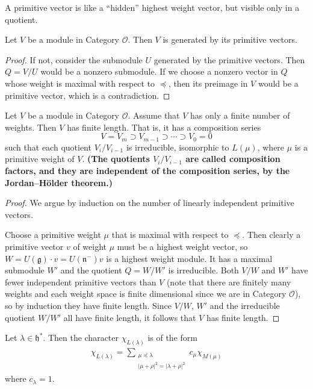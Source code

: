 \documentclass[12pt]{article}
\begin{document}
A primitive vector is like a “hidden” highest weight vector, but visible only in a quotient.

\begin{proposition}
    Let $V$ be a module in Category $\mathcal{O}$. Then $V$ is generated by its primitive vectors.
\end{proposition}

\begin{proof}
    If not, consider the submodule $U$ generated by the primitive vectors. Then $Q = V/U$ would be a nonzero submodule. If we choose a nonzero vector in $Q$ whose weight is maximal with respect to $\preceq$, then its preimage in $V$ would be a primitive vector, which is a contradiction.
\end{proof}

\begin{proposition}
    Let $V$ be a module in Category $\mathcal{O}$. Assume that $V$ has only a finite number of weights. Then $V$ has finite length. That is, it has a composition series
    \[
        V = V_m \supset V_{m-1} \supset \cdots \supset V_0 = 0
    \]
    such that each quotient $V_i/V_{i-1}$ is irreducible, isomorphic to $L(\mu)$, where $\mu$ is a primitive weight of $V$. \textbf{(The quotients $V_i/V_{i-1}$ are called composition factors, and they are independent of the composition series, by the Jordan–Hölder theorem.)}
\end{proposition}

\begin{proof}
    We argue by induction on the number of linearly independent primitive vectors.

    Choose a primitive weight $\mu$ that is maximal with respect to $\preceq$. Then clearly a primitive vector $v$ of weight $\mu$ must be a highest weight vector, so $W = U(\mathfrak{g}) \cdot v = U(\mathfrak{n}^-)v$ is a highest weight module. It has a maximal submodule $W'$ and the quotient $Q = W/W'$ is irreducible. Both $V/W$ and $W'$ have fewer independent primitive vectors than $V$ (note that there are finitely many weights and each weight space is finite dimensional since we are in Category $\mathcal{O}$), so by induction they have finite length. Since $V/W$, $W'$ and the irreducible quotient $W/W'$ all have finite length, it follows that $V$ has finite length.
\end{proof}

\begin{proposition}\label{prop:char-irr}
    Let $\lambda \in \mathfrak{h}^*$. Then the character $\chi_{L(\lambda)}$ is of the form
    \begin{align}
        \chi_{L(\lambda)} = \sum_{\substack{\mu \preceq \lambda \\ |\mu+\rho|^2 = |\lambda+\rho|^2}} c_\mu \chi_{M(\mu)}
    \end{align}
    where $c_\lambda = 1$.
\end{proposition}
\end{document}
